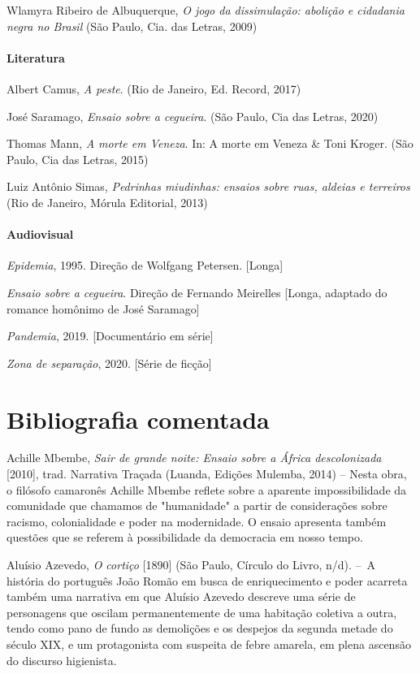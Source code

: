 \documentclass[12pt]{extarticle}
\begin{document}
Wlamyra Ribeiro de Albuquerque, \emph{O jogo da dissimulação: abolição e
cidadania negra no Brasil} (São Paulo, Cia. das Letras, 2009)

\paragraph{Literatura}

Albert Camus, \emph{A peste}. (Rio de Janeiro, Ed. Record, 2017)

José Saramago, \emph{Ensaio sobre a cegueira}. (São Paulo, Cia das
Letras, 2020)

Thomas Mann, \emph{A morte em Veneza}. In: A morte em Veneza \& Toni
Kroger. (São Paulo, Cia das Letras, 2015)

Luiz Antônio Simas, \emph{Pedrinhas miudinhas: ensaios sobre ruas,
aldeias e terreiros} (Rio de Janeiro, Mórula Editorial, 2013)

\paragraph{Audiovisual}

\emph{Epidemia}, 1995. Direção de Wolfgang Petersen. {[}Longa{]}

\emph{Ensaio sobre a cegueira}. Direção de Fernando Meirelles {[}Longa,
adaptado do romance homônimo de José Saramago{]}

\emph{Pandemia}, 2019. {[}Documentário em série{]}

\emph{Zona de separação}, 2020. {[}Série de ficção{]}

\section{Bibliografia comentada}


Achille Mbembe, \emph{Sair de grande noite: Ensaio sobre a África
descolonizada} {[}2010{]}, trad. Narrativa Traçada (Luanda, Edições
Mulemba, 2014) -- Nesta obra, o filósofo camaronês Achille Mbembe
reflete sobre a aparente impossibilidade da comunidade que chamamos de
"humanidade" a partir de considerações sobre racismo, colonialidade e
poder na modernidade. O ensaio apresenta também questões que se referem
à possibilidade da democracia em nosso tempo.


Aluísio Azevedo, \emph{O cortiço} {[}1890{]} (São Paulo, Círculo do
Livro, n/d). --~A história do português João Romão em busca de
enriquecimento e poder acarreta também uma narrativa em que Aluísio
Azevedo descreve uma série de personagens que oscilam permanentemente de
uma habitação coletiva a outra, tendo como pano de fundo as demolições e
os despejos da segunda metade do século XIX, e um protagonista com
suspeita de febre amarela, em plena ascensão do discurso higienista.
\end{document}
